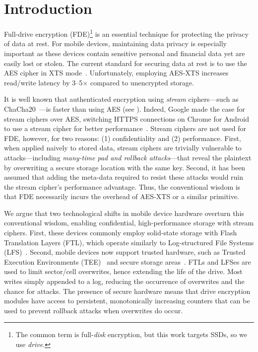 \section{Introduction}\label{sec:introduction}

Full-drive encryption (FDE)\footnote{The common term is full-\emph{disk}
encryption, but this work targets SSDs, so we use \emph{drive}.} is an essential
technique for protecting the privacy of data at rest. For mobile devices,
maintaining data privacy is especially important as these devices contain
sensitive personal and financial data yet are easily lost or stolen. The current
standard for securing data at rest is to use the AES cipher in XTS
mode~. Unfortunately, employing AES-XTS increases
read/write latency by 3--5$\times$ compared to unencrypted storage.

It is well known that authenticated encryption using \emph{stream}
ciphers---such as ChaCha20~\cite{ChaCha20}---is faster than using AES (see
). Indeed, Google made the case for stream ciphers over AES,
switching HTTPS connections on Chrome for Android to use a stream cipher for
better performance~\cite{google-blog}. Stream ciphers are not used for FDE,
however, for two reasons: (1) confidentiality and (2) performance. First, when
applied naively to stored data, stream ciphers are trivially vulnerable to
attacks---including \emph{many-time pad and rollback attacks}---that reveal the
plaintext by overwriting a secure storage location with the same key. Second, it
has been assumed that adding the meta-data required to resist these attacks
would ruin the stream cipher's performance advantage. Thus, the conventional
wisdom is that FDE necessarily incurs the overhead of AES-XTS or a similar
primitive.

We argue that two technological shifts in mobile device hardware overturn this
conventional wisdom, enabling confidential, high-performance storage with stream
ciphers. First, these devices commonly employ solid-state storage with Flash
Translation Layers (FTL), which operate similarly to Log-structured File Systems
(LFS)~\cite{LFS,F2FS,NILFS}. Second, mobile devices now support trusted
hardware, such as Trusted Execution Environments (TEE)~\cite{TEE,TrustZone} and
secure storage areas~\cite{eMMC-standard}. FTLs and LFSes are used to limit
sector/cell overwrites, hence extending the life of the drive. Most writes
simply appended to a log, reducing the occurrence of overwrites and the chance
for attacks. The presence of secure hardware means that drive encryption modules
have access to persistent, monotonically increasing counters that can be used to
prevent rollback attacks when overwrites do occur.

